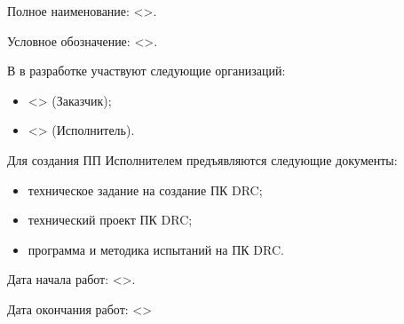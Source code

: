 


Полное наименование: <>.

Условное обозначение: <>.


В в разработке участвуют следующие организаций:

\begin{itemize}
	\item <> (Заказчик);
	\item <> (Исполнитель).
\end{itemize}


Для создания ПП Исполнителем предъявляются следующие документы:

\begin{itemize}
	\item техническое задание на создание ПК DRC;
	\item технический проект ПК DRC;
	\item программа и методика испытаний на ПК DRC.
\end{itemize}


Дата начала работ: <>.

Дата окончания работ: <>

